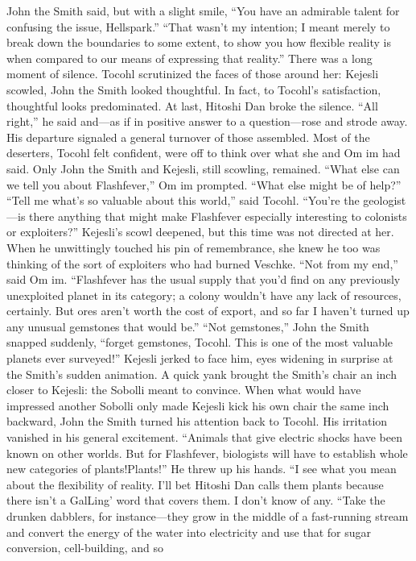 \documentclass[9pt]{article}
\begin{document}
John the Smith said, but with a slight smile, “You have an admirable talent for confusing the issue,
Hellspark.”
“That wasn’t my intention; I meant merely to break down the boundaries to some extent, to show
you how flexible reality is when compared to our means of expressing that reality.”
There was a long moment of silence. Tocohl scrutinized the faces of those around her: Kejesli
scowled, John the Smith looked thoughtful. In fact, to Tocohl’s satisfaction, thoughtful looks
predominated. At last, Hitoshi Dan broke the silence. “All right,” he said and—as if in positive answer to
a question—rose and strode away.
His departure signaled a general turnover of those assembled. Most of the deserters, Tocohl felt
confident, were off to think over what she and Om im had said. Only John the Smith and Kejesli, still
scowling, remained.
“What else can we tell you about Flashfever,” Om im prompted. “What else might be of help?”
“Tell me what’s so valuable about this world,” said Tocohl. “You’re the geologist—is there anything
that might make Flashfever especially interesting to colonists or exploiters?”
Kejesli’s scowl deepened, but this time was not directed at her. When he unwittingly touched his pin
of remembrance, she knew he too was thinking of the sort of exploiters who had burned Veschke.
“Not from my end,” said Om im. “Flashfever has the usual supply that you’d find on any previously
unexploited planet in its category; a colony wouldn’t have any lack of resources, certainly. But ores
aren’t worth the cost of export, and so far I haven’t turned up any unusual gemstones that would be.”
“Not gemstones,” John the Smith snapped suddenly, “forget gemstones, Tocohl. This is one of the
most valuable planets ever surveyed!”
Kejesli jerked to face him, eyes widening in surprise at the Smith’s sudden animation. A quick yank
brought the Smith’s chair an inch closer to Kejesli: the Sobolli meant to convince. When what would
have impressed another Sobolli only made Kejesli kick his own chair the same inch backward, John the
Smith turned his attention back to Tocohl.
His irritation vanished in his general excitement. “Animals that give electric shocks have been known
on other worlds. But for Flashfever, biologists will have to establish whole new categories of plants!Plants!” He threw up his hands. “I see what you mean about the flexibility of reality. I’ll bet Hitoshi Dan
calls them plants because there isn’t a GalLing’ word that covers them. I don’t know of any.
“Take the drunken dabblers, for instance—they grow in the middle of a fast-running stream and
convert the energy of the water into electricity and use that for sugar conversion, cell-building, and so
\end{document}

